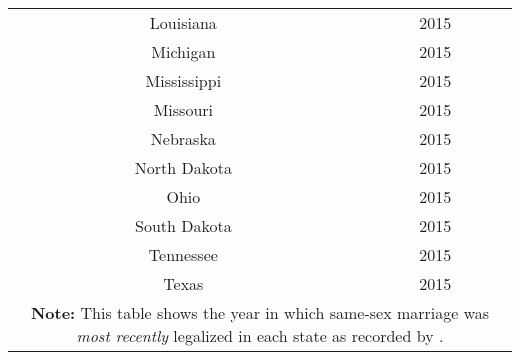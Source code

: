 \begin{longtable}{|c|c|}
Louisiana & 2015 \\
Michigan & 2015 \\
Mississippi & 2015 \\
Missouri & 2015 \\
Nebraska & 2015 \\
North Dakota & 2015 \\
Ohio & 2015 \\
South Dakota & 2015 \\
Tennessee & 2015 \\
Texas & 2015 \\
\hline
\multicolumn{2}{p{0.8\linewidth}}{\small \textbf{Note:} This table shows the year in which same-sex marriage was \textit{most recently} legalized in each state as recorded by \citet{27}.} \\ 
\end{longtable}

